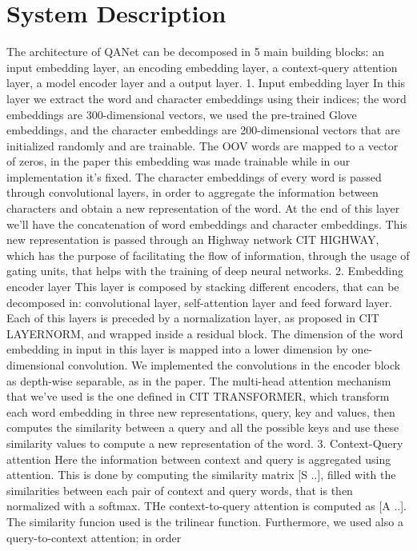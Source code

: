 \chapter{System Description} 
The architecture of QANet can be decomposed in 5 main building blocks: an input embedding layer, an encoding embedding layer, a context-query attention layer, a model encoder layer and a output layer.
1. Input embedding layer
In this layer we extract the word and character embeddings using their indices; the word embeddings are 300-dimensional vectors, we used the pre-trained Glove embeddings, and the character embeddings
are 200-dimensional vectors that are initialized randomly and are trainable. The OOV words are mapped to a vector of zeros, in the paper this embedding was made trainable while in our implementation it's fixed.
The character embeddings of every word is passed through convolutional layers, in order to aggregate the information between characters and obtain a new representation of the word. At the end of this layer we'll 
have the concatenation of word embeddings and character embeddings. This new representation is passed through an Highway network {CIT HIGHWAY}, which has the purpose of facilitating the flow of information,
through the usage of gating units, that helps with the training of deep neural networks.
2. Embedding encoder layer
This layer is composed by stacking different encoders, that can be decomposed in: convolutional layer, self-attention layer and feed forward layer. Each of this layers is preceded by a normalization layer,
as proposed in {CIT LAYERNORM}, and wrapped inside a residual block. The dimension of the word embedding in input in this layer is mapped into a lower dimension by one-dimensional convolution.
We implemented the convolutions in the encoder block as depth-wise separable, as in the paper. The multi-head attention mechanism that we've used is the one defined in {CIT TRANSFORMER}, which transform each word
embedding in three new representations, query, key and values, then computes the similarity between a query and all the possible keys and use these similarity values to compute a new representation of the word.
3. Context-Query attention
Here the information between context and query is aggregated using attention. This is done by computing the similarity matrix [S ..], filled with the similarities between each pair of context and query words, that
is then normalized with a softmax. THe context-to-query attention is computed as [A ..]. The similarity funcion used is the trilinear function. Furthermore, we used also a query-to-context attention; in order 
